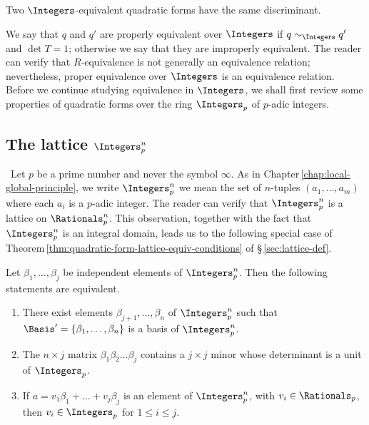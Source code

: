\begin{theorem}{\normalfont\cite[p.\,127]{cassels2008rational}}
    Two \(\Integers\)-equivalent quadratic forms have the same discriminant.
\end{theorem}

We say that \(q\) and \(q'\) are properly equivalent over \(\Integers\) if \(q \sim_{\Integers} q'\) and \(\det T = 1\); otherwise we say that they are improperly equivalent. The reader can verify that \(R\)-equivalence is not generally an equivalence relation; nevertheless, proper equivalence over \(\Integers\) is an equivalence relation. Before we continue studying equivalence in \(\Integers\), we shall first review some properties of quadratic forms over the ring \(\Integers_p\) of \(p\)-adic integers.

\subsection{The lattice \(\Integers_p^n\)}~Let \(p\) be a prime number and never the symbol \(\infty\). As in Chapter\,\ref{chap:local-global-principle}, we write \(\Integers_p^n\) we mean the set of \(n\)-tuples \((a_1, \dots, a_m)\) where each \(a_i\) is a \(p\)-adic integer. The reader can verify that \(\Integers_p^n\) is a lattice on \(\Rationals_p^n\). This observation, together with the fact that \(\Integers_p^n\) is an integral domain, leads us to the following special case of Theorem\,\ref{thm:quadratic-form-lattice-equiv-conditions} of \S\,\ref{sec:lattice-def}.\label{sec:the-lattice-zpn}

\begin{theorem}
    {\normalfont\cite[p.\,112]{cassels2008rational}}
    Let \(\beta_1, \dots, \beta_j\) be independent elements of \(\Integers_p^n\). Then the following statements are equivalent.

    \medskip

    \begin{enumerate}[nosep, label=(\alph*)]
        \item There exist elements \(\beta_{j+1}, \dots, \beta_n\) of \(\Integers_p^n\) such that \(\Basis' = \{\beta_1, \dots, \beta_n\}\) is a basis of \(\Integers_p^n\).
        \item The \(n \times j\) matrix \(\beta_1 \beta_2 \dots \beta_j\) contains a \(j \times j\) minor whose determinant is a unit of \(\Integers_p\).
        \item If \(a = v_1\beta_1 + \dots + v_j\beta_j\) is an element of \(\Integers_p^n\), with \(v_i \in \Rationals_p\), then \(v_i \in \Integers_p\) for \(1 \leq i \leq j\).
    \end{enumerate}
\end{theorem}

